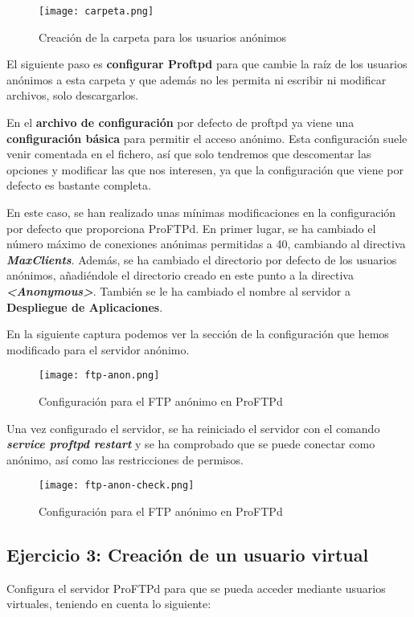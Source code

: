 \begin{figure}[H]
    \centering
    \texttt{[image: carpeta.png]}
    \caption{Creación de la carpeta para los usuarios anónimos}
\end{figure}

El siguiente paso es \textbf{configurar Proftpd} para que cambie la raíz de los usuarios anónimos a esta carpeta y que además no les permita ni escribir ni modificar archivos, solo descargarlos.

En el \textbf{archivo de configuración} por defecto de proftpd ya viene una \textbf{configuración básica} para permitir el acceso anónimo. Esta configuración suele venir comentada en el fichero, así que solo tendremos que descomentar las opciones y modificar las que nos interesen, ya que la configuración que viene por defecto es bastante completa.

En este caso, se han realizado unas mínimas modificaciones en la configuración por defecto que proporciona ProFTPd. En primer lugar, se ha cambiado el número máximo de conexiones anónimas permitidas a 40, cambiando al directiva \textbf{\textit{MaxClients}}. Además, se ha cambiado el directorio por defecto de los usuarios anónimos, añadiéndole el directorio creado en este punto a la directiva \textbf{\textit{<Anonymous>}}. También se le ha cambiado el nombre al servidor a \textbf{Despliegue de Aplicaciones}.

En la siguiente captura podemos ver la sección de la configuración que hemos modificado para el servidor anónimo.

\begin{figure}[H]
    \centering
    \texttt{[image: ftp-anon.png]}
    \caption{Configuración para el FTP anónimo en ProFTPd}
\end{figure}

Una vez configurado el servidor, se ha reiniciado el servidor con el comando \textbf{\textit{service proftpd restart}} y se ha comprobado que se puede conectar como anónimo, así como las restricciones de permisos.

\begin{figure}[H]
    \centering
    \texttt{[image: ftp-anon-check.png]}
    \caption{Configuración para el FTP anónimo en ProFTPd}
\end{figure}

\subsection{Ejercicio 3: Creación de un usuario virtual}
Configura el servidor ProFTPd para que se pueda acceder mediante usuarios virtuales, teniendo en cuenta lo siguiente:

